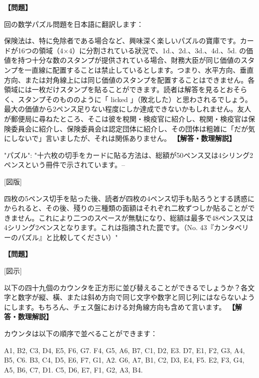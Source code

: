 \documentclass[10pt,a4paper,oneside,openany]{ltjsbook}
\begin{document}
\begin{tcolorbox}[colback=softblue,colframe=primaryblue,title=\textbf{第 308 問：THE GENTLE ART OF STAMP-LICKING.},arc=2mm,boxrule=1pt,breakable]
\textbf{【問題】}\par\vspace{0.3em}
回の数学パズル問題を日本語に翻訳します：

保険法は、特に免除者である場合など、興味深く楽しいパズルの寶庫です。カードが16つの領域（4×4）に分割されている狀況で、1d.、2d.、3d.、4d.、5d. の価値を持つ十分な数のスタンプが提供されている場合、財務大臣が同じ価値のスタンプを一直線に配置することは禁止しているとします。つまり、水平方向、垂直方向、または対角線上には同じ価値のスタンプを配置することはできません。各領域には一枚だけスタンプを貼ることができます。読者は解答を見るとおそらく、スタンプそのもののように「 licked 」（敗北した）と思わされるでしょう。最大の価値から2ペンス足りない程度にしか達成できないかもしれません。友人が郵便局に尋ねたところ、そこは彼を稅関・検疫官に紹介し、稅関・検疫官は保険委員会に紹介し、保険委員会は認定団体に紹介し、その団体は粗雑に「だが気にしないで」言いましたが、それは関係ありません。
\tcblower
\textbf{【解答・数理解説】}\par\vspace{0.3em}
{
"パズル": "十六枚の切手をカードに貼る方法は、総額が50ペンス又は4シリング2ペンスという冊件で示されています。--

[図版]

四枚の5ペンス切手を貼った後、読者が四枚の4ペンス切手も貼ろうとする誘惑にかられると、その後、殘りの三種類の面額はそれぞれ二枚ずつしか貼ることができません。これにより二つのスペースが無駄になり、総額は最多で48ペンス又は4シリング2ペンスとなります。これは指摘された罠です。（No. 43『カンタベリーのパズル』と比較してください）"
}
\end{tcolorbox}

\begin{tcolorbox}[colback=softblue,colframe=primaryblue,title=\textbf{第 309 問：四十九個のカウンタを並べる （原題: THE FORTY-NINE COUNTERS.）},arc=2mm,boxrule=1pt,breakable]
\textbf{【問題】}\par\vspace{0.3em}
[図示]

以下の四十九個のカウンタを正方形に並び替えることができるでしょうか？各文字と数字が縦、橫、または斜め方向で同じ文字や数字と同じ列にはならないようにします。もちろん、チェス盤における対角線方向も含めて言います。
\tcblower
\textbf{【解答・数理解説】}\par\vspace{0.3em}
カウンタは以下の順序で並べることができます：

    A1,  B2,  C3,  D4,  E5,  F6,  G7.
    F4,  G5,  A6,  B7,  C1,  D2,  E3.
    D7,  E1,  F2,  G3,  A4,  B5,  C6.
    B3,  C4,  D5,  E6,  F7,  G1,  A2.
    G6,  A7,  B1,  C2,  D3,  E4,  F5.
    E2,  F3,  G4,  A5,  B6,  C7,  D1.
    C5,  D6,  E7,  F1,  G2,  A3,  B4.
\end{tcolorbox}
\end{document}
